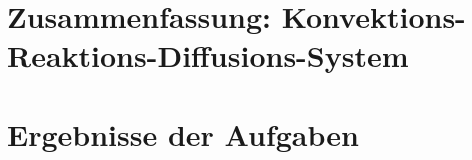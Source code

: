 \documentclass[12pt,a4paper]{scrartcl}
\numberwithin{equation}{section}
\begin{document}


\tableofcontents

\section{Zusammenfassung: Konvektions-Reaktions-Diffusions-System}

\newpage
\section{Ergebnisse der Aufgaben}

\end{document}
